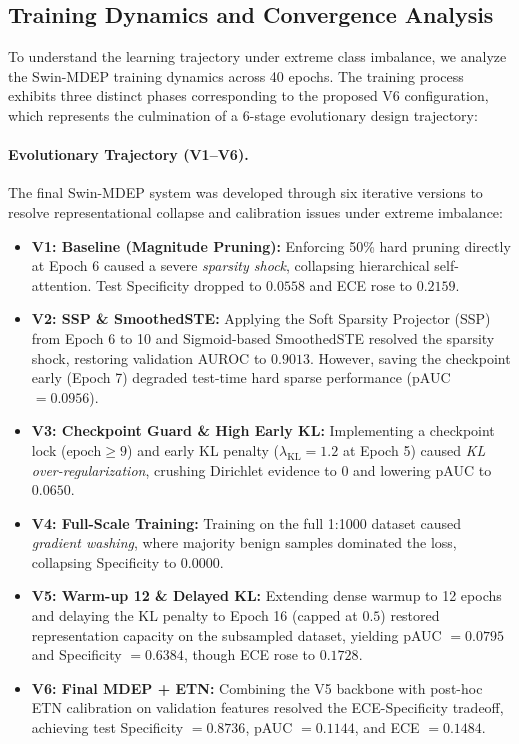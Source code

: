 \documentclass[letterpaper]{article} %
\begin{document}
\subsection{Training Dynamics and Convergence Analysis}\label{subsec:dynamics}
To understand the learning trajectory under extreme class imbalance, we analyze the Swin-MDEP training dynamics across 40 epochs. The training process exhibits three distinct phases corresponding to the proposed V6 configuration, which represents the culmination of a 6-stage evolutionary design trajectory:

\paragraph{Evolutionary Trajectory (V1--V6).}
The final Swin-MDEP system was developed through six iterative versions to resolve representational collapse and calibration issues under extreme imbalance:
\begin{itemize}
    \item \textbf{V1: Baseline (Magnitude Pruning):} Enforcing 50\% hard pruning directly at Epoch 6 caused a severe \emph{sparsity shock}, collapsing hierarchical self-attention. Test Specificity dropped to $0.0558$ and ECE rose to $0.2159$.
    \item \textbf{V2: SSP \& SmoothedSTE:} Applying the Soft Sparsity Projector (SSP) from Epoch 6 to 10 and Sigmoid-based SmoothedSTE resolved the sparsity shock, restoring validation AUROC to $0.9013$. However, saving the checkpoint early (Epoch 7) degraded test-time hard sparse performance (pAUC $= 0.0956$).
    \item \textbf{V3: Checkpoint Guard \& High Early KL:} Implementing a checkpoint lock ($\text{epoch} \ge 9$) and early KL penalty ($\lambda_{\text{KL}} = 1.2$ at Epoch 5) caused \emph{KL over-regularization}, crushing Dirichlet evidence to 0 and lowering pAUC to $0.0650$.
    \item \textbf{V4: Full-Scale Training:} Training on the full 1:1000 dataset caused \emph{gradient washing}, where majority benign samples dominated the loss, collapsing Specificity to $0.0000$.
    \item \textbf{V5: Warm-up 12 \& Delayed KL:} Extending dense warmup to 12 epochs and delaying the KL penalty to Epoch 16 (capped at $0.5$) restored representation capacity on the subsampled dataset, yielding pAUC $= 0.0795$ and Specificity $= 0.6384$, though ECE rose to $0.1728$.
    \item \textbf{V6: Final MDEP + ETN:} Combining the V5 backbone with post-hoc ETN calibration on validation features resolved the ECE-Specificity tradeoff, achieving test Specificity $= 0.8736$, pAUC $= 0.1144$, and ECE $= 0.1484$.
\end{itemize}
\end{document}
